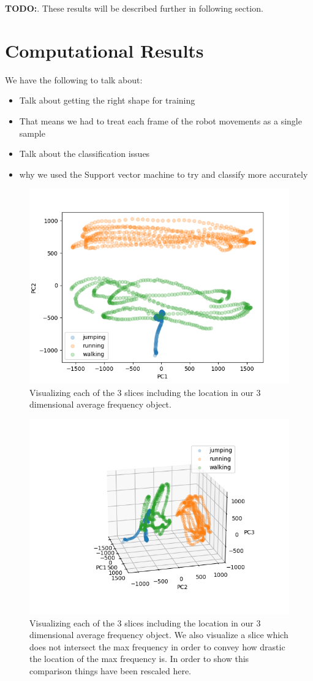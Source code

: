 \documentclass[11pt]{amsart}
\begin{document}
\textbf{TODO:}. These results will be described further in following section.

\section{Computational Results}\label{sec:results}
We have the following to talk about:
\begin{itemize}
\item Talk about getting the right shape for training
\item That means we had to treat each frame of the robot movements as a single sample
\item Talk about the classification issues
\item why we used the Support vector machine to try and classify more accurately
\end{itemize}

\begin{figure}[h]
	\centering
	\includegraphics[width=.5\textwidth]{../visualizations/pca_2_components_plot.png}
 	\caption{Visualizing each of the 3 slices including the location in our 3 dimensional average frequency object.}\label{fig:f1_0}
\end{figure}

\begin{figure}[h]
	\centering
	\includegraphics[width=.5\textwidth]{../visualizations/pca_3_components_plot.png}
 	\caption{Visualizing each of the 3 slices including the location in our 3 dimensional average frequency object. We also visualize a slice which does not intersect the max frequency in order to convey how drastic the location of the max frequency is. In order to show this comparison things have been rescaled here.}\label{fig:f1}
\end{figure}
\end{document}
